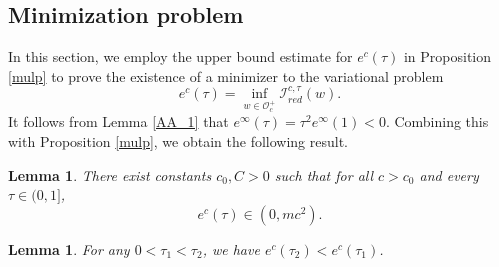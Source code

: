 \documentclass{amsart}
\theoremstyle{plain}
\newtheorem{lemma}[theorem]{Lemma}
\theoremstyle{definition}
\theoremstyle{remark}
\numberwithin{equation}{section} \numberwithin{figure}{section}
\begin{document}
\subsection{Minimization problem}\label{4.2}
In this section, we  employ the upper bound estimate for $e^c(\tau)$ in Proposition \ref{mulp} to prove the existence of a minimizer to the variational problem $$
e^c(\tau)=\inf _{w \in \mathcal{O}_c^{+}} \mathcal{I }_{red}^{c,\tau}  (w).
$$
It follows from Lemma \ref{AA_1} that \( e^{\infty}(\tau) = \tau^2 e^{\infty}(1) < 0 \). Combining this with Proposition \ref{mulp}, we obtain the following result.

\begin{lemma}\label{as_stb}
There exist constants \( c_0, C > 0 \) such that for all \( c > c_0 \) and every \( \tau \in (0,1] \), 
\[
e^c(\tau) \in (0, m c^2).
\]
\end{lemma}


\begin{lemma}\label{lemm_3.88}
  For any $0 < \tau_1 < \tau_2$, we have $e^c(\tau_2) < e^c(\tau_1)$.
\end{lemma}
\end{document}

